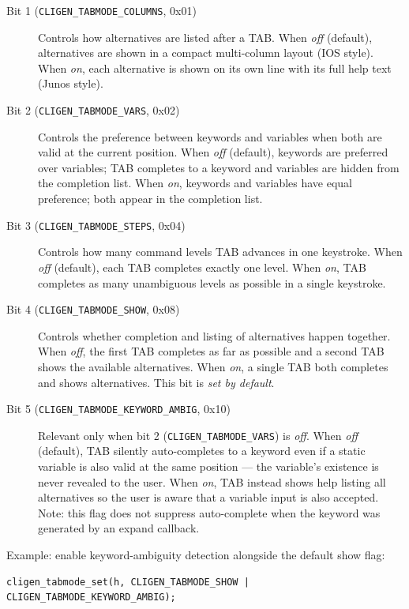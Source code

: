 \documentclass[a4paper, 10pt] {article}
\begin{document}
\begin{description}
\item[Bit 1 ({\tt CLIGEN\_TABMODE\_COLUMNS}, 0x01)]
  Controls how alternatives are listed after a TAB.
  When \emph{off} (default), alternatives are shown in a compact multi-column
  layout (IOS style).
  When \emph{on}, each alternative is shown on its own line with its full help
  text (Junos style).

\item[Bit 2 ({\tt CLIGEN\_TABMODE\_VARS}, 0x02)]
  Controls the preference between keywords and variables when both are valid
  at the current position.
  When \emph{off} (default), keywords are preferred over variables; TAB
  completes to a keyword and variables are hidden from the completion list.
  When \emph{on}, keywords and variables have equal preference; both appear
  in the completion list.

\item[Bit 3 ({\tt CLIGEN\_TABMODE\_STEPS}, 0x04)]
  Controls how many command levels TAB advances in one keystroke.
  When \emph{off} (default), each TAB completes exactly one level.
  When \emph{on}, TAB completes as many unambiguous levels as possible in a
  single keystroke.

\item[Bit 4 ({\tt CLIGEN\_TABMODE\_SHOW}, 0x08)]
  Controls whether completion and listing of alternatives happen together.
  When \emph{off}, the first TAB completes as far as possible and a second
  TAB shows the available alternatives.
  When \emph{on}, a single TAB both completes and shows alternatives.
  This bit is \emph{set by default}.

\item[Bit 5 ({\tt CLIGEN\_TABMODE\_KEYWORD\_AMBIG}, 0x10)]
  Relevant only when bit 2 ({\tt CLIGEN\_TABMODE\_VARS}) is \emph{off}.
  When \emph{off} (default), TAB silently auto-completes to a keyword even
  if a static variable is also valid at the same position --- the variable's
  existence is never revealed to the user.
  When \emph{on}, TAB instead shows help listing all alternatives so the user
  is aware that a variable input is also accepted.
  Note: this flag does not suppress auto-complete when the keyword was generated
  by an expand callback.

\end{description}

Example: enable keyword-ambiguity detection alongside the default show flag:
\begin{verbatim}
cligen_tabmode_set(h, CLIGEN_TABMODE_SHOW | CLIGEN_TABMODE_KEYWORD_AMBIG);
\end{verbatim}
\end{document}
